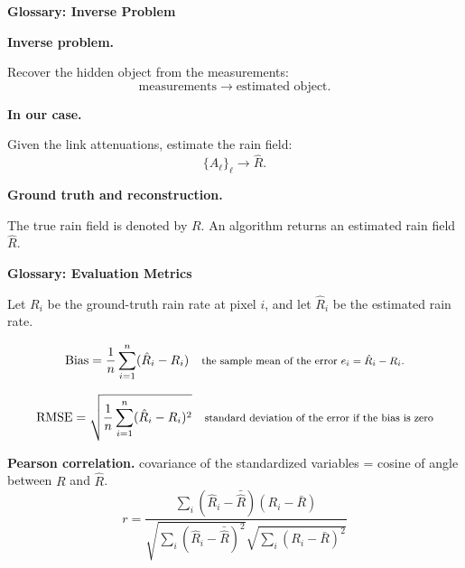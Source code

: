 
\begin{frame}[plain]
    \vspace{-0.5mm}
    \begin{center}\large\bfseries Glossary: Inverse Problem\end{center}
    \vspace{4mm}

    \textbf{Inverse problem.}

    \vspace{1mm}
    Recover the hidden object from the measurements:
    \[
        \text{measurements} \longrightarrow \text{estimated object}.
    \]

    \vspace{3mm}
    \textbf{In our case.}

    \vspace{1mm}
    Given the link attenuations, estimate the rain field:
    \[
        \{A_\ell\}_\ell \longrightarrow \hat R .
    \]

    \vspace{3mm}
    \textbf{Ground truth and reconstruction.}

    \vspace{1mm}
    The true rain field is denoted by $R$. An algorithm returns an estimated rain field $\hat R$.
\end{frame}

\begin{frame}[plain]
    \vspace{-0.5mm}
    \begin{center}\large\bfseries Glossary: Evaluation Metrics\end{center}
    \vspace{3mm}

    Let $R_i$ be the ground-truth rain rate at pixel $i$, and let $\hat R_i$ be the estimated rain rate.

    \[
        \mathrm{Bias}
        =
        \frac{1}{n}\sum_{i=1}^n(\hat R_i-R_i) \quad \text{{\footnotesize the sample mean of the error $e_i=\hat R_i-R_i$.}}
    \]



    \[
        \mathrm{RMSE}
        =
        \sqrt{\frac{1}{n}\sum_{i=1}^n(\hat R_i-R_i)^2} \quad \text{{\footnotesize standard deviation of the error if the bias is zero}}
    \]




    \vspace{2mm}
    \textbf{Pearson correlation.}   covariance of the standardized variables = cosine of angle between $R$ and $\hat{R}$.
    \[
        r
        =
        \frac{\sum_i(\hat R_i-\bar{\hat R})(R_i-\bar R)}
        {\sqrt{\sum_i(\hat R_i-\bar{\hat R})^2}
            \sqrt{\sum_i(R_i-\bar R)^2}}
    \]

\end{frame}


